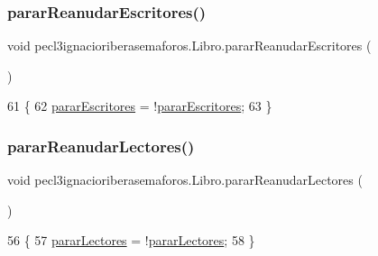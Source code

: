 \subsubsection{\texorpdfstring{parar\+Reanudar\+Escritores()}{pararReanudarEscritores()}}
{\footnotesize\ttfamily void pecl3ignacioriberasemaforos.\+Libro.\+parar\+Reanudar\+Escritores (\begin{DoxyParamCaption}{ }\end{DoxyParamCaption})\hspace{0.3cm}{\ttfamily [inline]}}


\begin{DoxyCode}
61     \{
62         \mbox{\hyperlink{classpecl3ignacioriberasemaforos_1_1_libro_a3b3677781b08023845a9279e42d6e731}{pararEscritores}} = !\mbox{\hyperlink{classpecl3ignacioriberasemaforos_1_1_libro_a3b3677781b08023845a9279e42d6e731}{pararEscritores}};
63     \}
\end{DoxyCode}
\mbox{\label{classpecl3ignacioriberasemaforos_1_1_libro_afd336fcdff8177ebfcebbc68a7333fde}} 
\subsubsection{\texorpdfstring{parar\+Reanudar\+Lectores()}{pararReanudarLectores()}}
{\footnotesize\ttfamily void pecl3ignacioriberasemaforos.\+Libro.\+parar\+Reanudar\+Lectores (\begin{DoxyParamCaption}{ }\end{DoxyParamCaption})\hspace{0.3cm}{\ttfamily [inline]}}


\begin{DoxyCode}
56     \{
57         \mbox{\hyperlink{classpecl3ignacioriberasemaforos_1_1_libro_af552bf9166c3f93d14f20bdaca4a0735}{pararLectores}} = !\mbox{\hyperlink{classpecl3ignacioriberasemaforos_1_1_libro_af552bf9166c3f93d14f20bdaca4a0735}{pararLectores}};
58     \}
\end{DoxyCode}
\mbox{\label{classpecl3ignacioriberasemaforos_1_1_libro_a21c76550518b5fd6a966cd4dc6522fff}} 
